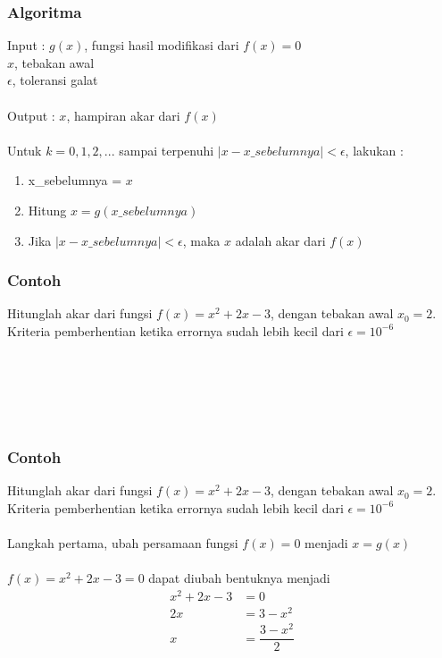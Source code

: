 \documentclass{beamer}
\begin{document}
\begin{frame}
\frametitle{Algoritma}
Input : $g(x)$, fungsi hasil modifikasi dari $f(x)=0$
\\\quad \qquad $x$, tebakan awal
\\\quad \qquad $\epsilon$, toleransi galat
\\\ \\Output : $x$, hampiran akar dari $f(x)$
\\\ \\Untuk $k=0,1,2, ...$ sampai terpenuhi $|x-x\_sebelumnya|<\epsilon$, lakukan :
\begin{enumerate}
\item x\_sebelumnya = $x$
\item Hitung $x = g(x\_sebelumnya)$
\item Jika $|x-x\_sebelumnya|<\epsilon$, maka $x$ adalah akar dari $f(x)$
\end{enumerate} 
\end{frame}


\begin{frame}
\frametitle{Contoh}
Hitunglah akar dari fungsi $f(x)=x^2+2x-3$, dengan tebakan awal $x_0=2$. \\Kriteria pemberhentian ketika errornya sudah lebih kecil dari $\epsilon = 10^{-6}$ 
\\\ \\\ 
\\\ \\\ 
\begin{equation}
\begin{split}
\ 
\\\ 
\\\
\end{split}
\nonumber
\end{equation}
\end{frame}


\begin{frame}
\frametitle{Contoh}
Hitunglah akar dari fungsi $f(x)=x^2+2x-3$, dengan tebakan awal $x_0=2$. \\Kriteria pemberhentian ketika errornya sudah lebih kecil dari $\epsilon = 10^{-6}$ 
\\\ \\Langkah pertama, ubah persamaan fungsi $f(x)=0$ menjadi $x=g(x)$
\\\ \\$f(x) = x^2+2x-3 = 0$ dapat diubah bentuknya menjadi 
\begin{equation}
\begin{split}
x^2+2x-3 &= 0
\\2x &= 3-x^2
\\x & = \dfrac{3-x^2}{2}
\end{split}
\nonumber
\end{equation}
\end{frame}
\end{document}
